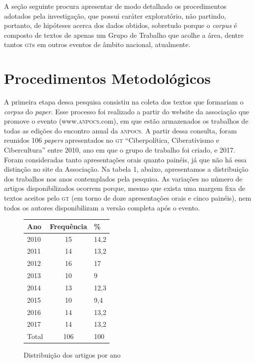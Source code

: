 A seção seguinte procura apresentar de modo detalhado os procedimentos
adotados pela investigação, que possui caráter exploratório, não
partindo, portanto, de hipóteses acerca dos dados obtidos, sobretudo
porque o \emph{corpus} é composto de textos de apenas um Grupo de
Trabalho que acolhe a área, dentre tantos \textsc{gt}s em outros eventos de
âmbito nacional, atualmente.

\section{Procedimentos Metodológicos}

A primeira etapa dessa pesquisa consistiu na coleta dos textos que
formariam o \emph{corpus} do \emph{paper}. Esse processo foi realizado a
partir do website da associação que promove o evento (www.\textsc{anpocs}.com),
em que estão armazenados os trabalhos de todas as edições do encontro
anual da \textsc{\textsc{anpocs}}. A partir dessa consulta, foram reunidos 106
\emph{papers} apresentados no \textsc{gt} ``Ciberpolítica, Ciberativismo e
Cibercultura'' entre 2010, ano em que o grupo de trabalho foi criado, e
2017. Foram consideradas tanto apresentações orais quanto painéis, já
que não há essa distinção no site da Associação. Na tabela 1, abaixo,
apresentamos a distribuição dos trabalhos nos anos contemplados pela
pesquisa. As variações no número de artigos disponibilizados ocorrem
porque, mesmo que exista uma margem fixa de textos aceitos pelo \textsc{gt} (em
torno de doze apresentações orais e cinco painéis), nem todos os
autores disponibilizam a versão completa após o evento.
\enlargethispage{\baselineskip}


\begin{figure}[!ht]
\centering
\begin{tabular}{|l|c|l|}
\hline
Ano & Frequência & \% \\ \hline
2010 & 15 & 14,2 \\ \hline
2011 & 14 & 13,2 \\ \hline
2012 & 16 & 17 \\ \hline
2013 & 10 & 9 \\ \hline
2014 & 13 & 12,3 \\ \hline
2015 & 10 & 9,4 \\ \hline
2016 & 14 & 13,2 \\ \hline
2017 & 14 & 13,2 \\ \hline
Total & 106 & 100 \\ \hline
\end{tabular}

\caption{Distribuição dos artigos por ano\footnotemark}

\end{figure}

